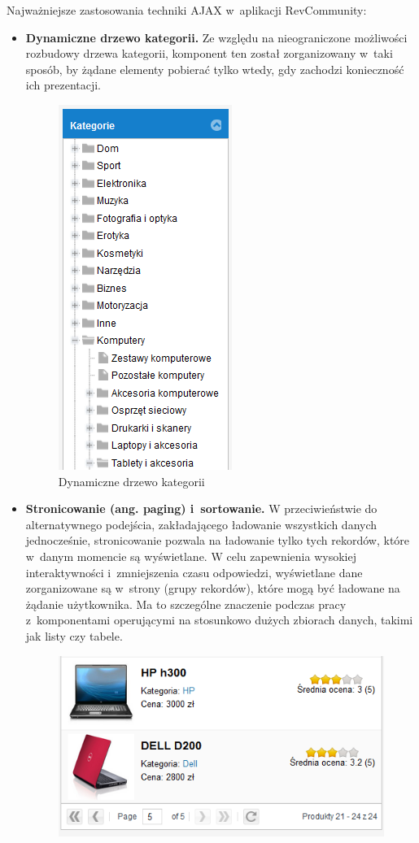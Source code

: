 Najważniejsze zastosowania techniki AJAX w~aplikacji RevCommunity:
\begin{itemize}
\item\textbf{Dynamiczne drzewo kategorii.} Ze względu na nieograniczone możliwości rozbudowy drzewa kategorii, komponent ten został zorganizowany w~taki sposób, by żądane elementy pobierać tylko wtedy, gdy zachodzi konieczność ich prezentacji.
\begin{figure}[H]
	\centering
	\includegraphics[scale=0.7]{images/Kategorie.png}
	\caption{Dynamiczne drzewo kategorii}
\end{figure}
\item\textbf{Stronicowanie (ang. paging) i~sortowanie.} W przeciwieństwie do alternatywnego podejścia, zakładającego ładowanie wszystkich danych jednocześnie, stronicowanie pozwala na ładowanie tylko tych rekordów, które w~danym momencie są wyświetlane. W celu zapewnienia wysokiej interaktywności i~zmniejszenia czasu odpowiedzi, wyświetlane dane zorganizowane są w~strony (grupy rekordów), które mogą być ładowane na żądanie użytkownika. Ma to szczególne znaczenie podczas pracy z~komponentami operującymi na stosunkowo dużych zbiorach danych, takimi jak listy czy tabele.
\begin{figure}[H]
	\centering
	\includegraphics[scale=0.7]{images/paging.png}

\end{figure}
\end{itemize}
